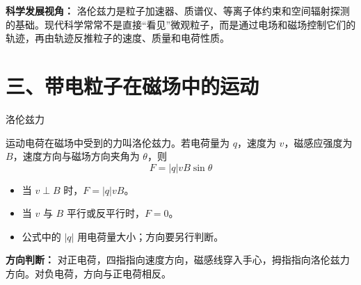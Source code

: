 \textbf{科学发展视角：} 洛伦兹力是粒子加速器、质谱仪、等离子体约束和空间辐射探测的基础。现代科学常常不是直接“看见”微观粒子，而是通过电场和磁场控制它们的轨迹，再由轨迹反推粒子的速度、质量和电荷性质。

\section*{三、带电粒子在磁场中的运动}

\begin{conceptbox}{洛伦兹力}

运动电荷在磁场中受到的力叫洛伦兹力。若电荷量为 $q$，速度为 $v$，磁感应强度为 $B$，速度方向与磁场方向夹角为 $\theta$，则
\[
\boxed{F = |q|vB\sin\theta}
\]

\begin{itemize}
  \item 当 $v\perp B$ 时，$F=|q|vB$。
  \item 当 $v$ 与 $B$ 平行或反平行时，$F=0$。
  \item 公式中的 $|q|$ 用电荷量大小；方向要另行判断。
\end{itemize}

\begin{center}


\label{fig:lorentz-force-direction}
\end{center}

\textbf{方向判断：} 对正电荷，四指指向速度方向，磁感线穿入手心，拇指指向洛伦兹力方向。对负电荷，方向与正电荷相反。

\end{conceptbox}

